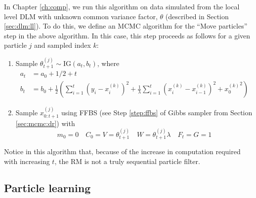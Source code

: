 In Chapter \ref{ch:comp}, we run this algorithm on data simulated from the local level DLM with unknown common variance factor, $\theta$ (described in Section \ref{sec:dlm:ll}). To do this, we define an MCMC algorithm for the ``Move particles'' step in the above algorithm. In this case, this step proceeds as follows for a given particle $j$ and sampled index $k$:
\begin{enumerate}
\item \label{step:move:ll} Sample $\theta^{(j)}_{t+1} \sim \mbox{IG}(a_t, b_t)$, where
\begin{align*}
a_t &= a_0 + 1/2 + t \\
b_t &= b_0 + \frac{1}{2}\left(\sum_{i=1}^t (y_i - x_i^{(k)})^2 + \frac{1}{\lambda}\sum_{i=1}^t (x_i^{(k)} - x_{i-1}^{(k)})^2 + {x^{(k)}_0}^2\right)
\end{align*}
\item Sample $x_{0:t+1}^{(j)}$ using FFBS (see Step \ref{step:ffbs} of Gibbs sampler from Section \ref{sec:mcmc:dr}) with
\[m_0 = 0 \quad C_0 = V = \theta^{(j)}_{t+1} \quad W = \theta_{t+1}^{(j)}\lambda \quad F_t = G = 1\]
\end{enumerate}
Notice in this algorithm that, because of the increase in computation required with increasing $t$, the RM is not a truly sequential particle filter.

\subsection{Particle learning \label{sec:pl}}

